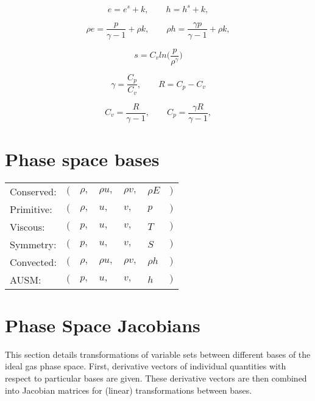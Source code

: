 \documentclass{article}
\begin{document}
\begin{equation*}
    e = e^s + k,
    \quad \quad
    h = h^s + k,
\end{equation*}

\begin{equation*}
    \rho e = \frac{p}{\gamma-1} + \rho k,
    \quad \quad
    \rho h = \frac{\gamma p}{\gamma-1} + \rho k,
\end{equation*}

\begin{equation*}
    s = C_v ln\bigg(\frac{p}{\rho^{\gamma}}\bigg)
\end{equation*}

\begin{equation*}
    \gamma = \frac{C_p}{C_v},
    \quad \quad
    R = C_p - C_v
\end{equation*}

\begin{equation*}
    C_v = \frac{R}{\gamma -1},
    \quad \quad
    C_p = \frac{\gamma R}{\gamma -1},
\end{equation*}


\newpage
\section{Phase space bases}
\begin{tabular}{l l l l l l l}
     Conserved: & $($ & $\rho,$ & $\rho u,$ & $\rho v,$ & $\rho E$ & $)$ \\
     Primitive: & $($ & $\rho,$ & $u,     $ & $v,     $ & $p$      & $)$ \\
     Viscous:   & $($ & $p,   $ & $u,     $ & $v,     $ & $T$      & $)$ \\
     Symmetry:  & $($ & $p,   $ & $u,     $ & $v,     $ & $S$      & $)$ \\
     Convected: & $($ & $\rho,$ & $\rho u,$ & $\rho v,$ & $\rho h$ & $)$ \\
     AUSM:      & $($ & $p,   $ & $u,     $ & $v,     $ & $h$      & $)$
\end{tabular}


\section{Phase Space Jacobians}
This section details transformations of variable sets between different bases of the ideal gas phase space.
First, derivative vectors of individual quantities with respect to particular bases are given.
These derivative vectors are then combined into Jacobian matrices for (linear) transformations between bases.
\end{document}
